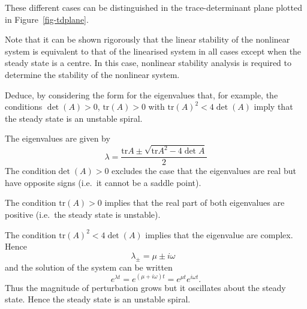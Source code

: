\documentclass[
  letterpaper,
  DIV=11,
  numbers=noendperiod]{scrreprt}
\begin{document}
These different cases can be distinguished in the trace-determinant
plane plotted in Figure~\ref{fig-tdplane}.

Note that it can be shown rigorously that the linear stability of the
nonlinear system is equivalent to that of the linearised system in all
cases except when the steady state is a centre. In this case, nonlinear
stability analysis is required to determine the stability of the
nonlinear system.

\begin{tcolorbox}[enhanced jigsaw, bottomtitle=1mm, rightrule=.15mm, colback=white, leftrule=.75mm, title=\textcolor{quarto-callout-note-color}{\faInfo}\hspace{0.5em}{Note}, bottomrule=.15mm, coltitle=black, toptitle=1mm, breakable, colframe=quarto-callout-note-color-frame, titlerule=0mm, toprule=.15mm, opacitybacktitle=0.6, arc=.35mm, colbacktitle=quarto-callout-note-color!10!white, left=2mm, opacityback=0]

Deduce, by considering the form for the eigenvalues that, for example,
the conditions \(\det(A)>0\), \(\mathrm{tr}(A)>0\) with
\(\mathrm{tr}(A)^2<4 \det(A)\) imply that the steady state is an
unstable spiral.

\end{tcolorbox}

\begin{tcolorbox}[enhanced jigsaw, bottomtitle=1mm, rightrule=.15mm, colback=white, leftrule=.75mm, title=\textcolor{quarto-callout-tip-color}{\faLightbulb}\hspace{0.5em}{Tip}, bottomrule=.15mm, coltitle=black, toptitle=1mm, breakable, colframe=quarto-callout-tip-color-frame, titlerule=0mm, toprule=.15mm, opacitybacktitle=0.6, arc=.35mm, colbacktitle=quarto-callout-tip-color!10!white, left=2mm, opacityback=0]

The eigenvalues are given by \[
\lambda = \frac{\mathrm{tr}{A}\pm \sqrt{\mathrm{tr}{A}^2-4\det{A}}}{2}
\] The condition\(\det(A)>0\) excludes the case that the eigenvalues are
real but have opposite signs (i.e.~it cannot be a saddle point).

The condition \(\mathrm{tr}(A)>0\) implies that the real part of both
eigenvalues are positive (i.e.~the steady state is unstable).

The condition \(\mathrm{tr}(A)^2<4 \det(A)\) implies that the eigenvalue
are complex. Hence \[
\lambda_{\pm}=\mu\pm i\omega \ \ \ 
\] and the solution of the system can be written \[
e^{\lambda t} = e^{(\mu+i\omega) t} = e^{\mu t}e^{i\omega t}. 
\] Thus the magnitude of perturbation grows but it oscillates about the
steady state. Hence the steady state is an unstable spiral.

\end{tcolorbox}
\end{document}

